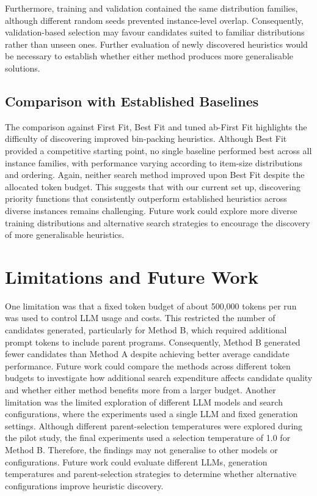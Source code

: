 \documentclass[12pt]{article}
\begin{document}
Furthermore, training and validation contained the same distribution families, although different random seeds prevented instance-level overlap. Consequently, validation-based selection may favour candidates suited to familiar distributions rather than unseen ones. Further evaluation of newly discovered heuristics would be necessary to establish whether either method produces more generalisable solutions.

\subsection{Comparison with Established Baselines}
The comparison against First Fit, Best Fit and tuned ab-First Fit highlights the difficulty of discovering improved bin-packing heuristics. Although Best Fit provided a competitive starting point, no single baseline performed best across all instance families, with performance varying according to item-size distributions and ordering. Again, neither search method improved upon Best Fit despite the allocated token budget. This suggests that with our current set up, discovering priority functions that consistently outperform established heuristics across diverse instances remains challenging. Future work could explore more diverse training distributions and alternative search strategies to encourage the discovery of more generalisable heuristics.
\section{Limitations and Future Work}
 One limitation was that a fixed token budget of about 500,000 tokens per run was used  to control LLM usage and costs. This restricted the number of candidates generated, particularly for Method B, which required additional prompt tokens to include parent programs. Consequently, Method B generated fewer candidates than Method A despite achieving better average candidate performance. Future work could compare the methods across different token budgets to investigate how additional search expenditure affects candidate quality and whether either method benefits more from a larger budget.
Another limitation was the limited exploration of different LLM models and search configurations, where the experiments used a single LLM and fixed generation settings. Although different parent-selection temperatures were explored during the pilot study, the final experiments used a selection temperature of 1.0 for Method B. Therefore, the findings may not generalise to other models or configurations. Future work could evaluate different LLMs, generation temperatures and parent-selection strategies to determine whether alternative configurations improve heuristic discovery.
\end{document}
